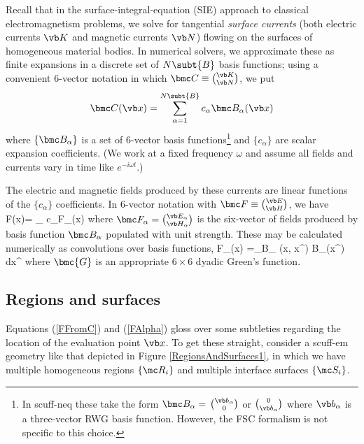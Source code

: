 \documentclass[letterpaper]{article}
\begin{document}
Recall that in the surface-integral-equation (SIE) approach to
classical electromagnetism problems, we solve for tangential
\textit{surface currents} (both electric currents $\vb K$ 
and magnetic currents $\vb N$) flowing on the surfaces of 
homogeneous material bodies. In numerical solvers, we 
approximate these as finite expansions in a discrete set
of $N\subt{B}$ basis functions; using a convenient 6-vector notation 
in which $\bmc C\equiv {\vb K \choose \vb N}$, we put
$$ \bmc C(\vb x)=\sum_{\alpha=1}^{N\subt{B}} 
   c_\alpha \bmc B_\alpha(\vb x) 
$$ 
where $\{\bmc B_\alpha\}$ is a set of 6-vector basis 
functions\footnote{In {\sc scuff-neq} these take the form
$\bmc B_\alpha=$ 
$\vb b_\alpha \choose 0$ 
or 
$0 \choose \vb b_\alpha$
where $\vb b_\alpha$ is a three-vector RWG basis function.
However, the FSC formalism is not specific to this choice.}
and $\{c_\alpha\}$ are scalar expansion coefficients.
(We work at a fixed frequency $\omega$ and assume all fields
and currents vary in time like $e^{-i\omega t}$.)

The electric and magnetic fields produced by these currents
are linear functions of the $\{c_\alpha\}$ coefficients.
In 6-vector notation with $\bmc F\equiv {\vb E \choose \vb H}$, we have
{ \bmc F(\vb x)=
   \sum_{\alpha} c_\alpha \bmc F_\alpha(\vb x)
}
where $\bmc F_\alpha={\vb E_\alpha \choose \vb H_\alpha}$ 
is the six-vector of fields produced by basis function $\bmc B_\alpha$ 
populated with unit strength. These may be calculated numerically
as convolutions over basis functions,
{
  \bmc F_\alpha(\vb x)
   =\int_{\sup \bmc B_\alpha} (\vb x, \vb x^\prime)
    \bmc B_\alpha(\vb x^\prime) \, d\vb x^\prime
}
where $\bmc{G}$ is an appropriate $6\times 6$ dyadic Green's
function.

\subsection*{Regions and surfaces}

Equations (\ref{FFromC}) and (\ref{FAlpha}) gloss over
some subtleties regarding the location of the evaluation
point $\vb x$. To get these straight, consider
a {\sc scuff-em} geometry like that depicted
in Figure \ref{RegionsAndSurfaces1}, in which we 
have multiple homogeneous regions $\{\mc R_i\}$
and multiple interface surfaces $\{\mc S_i\}$.
\end{document}

